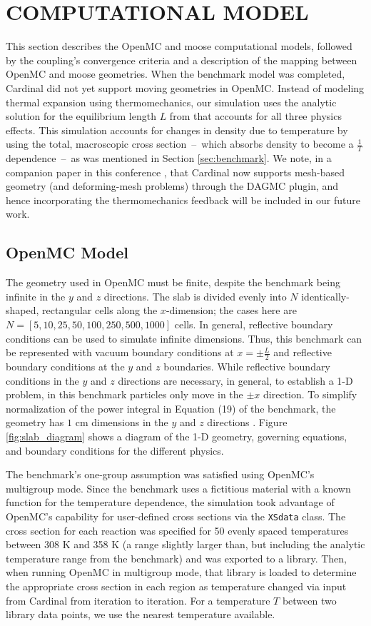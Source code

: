 \documentclass[letterpaper]{mc2023}
\begin{document}
\section{COMPUTATIONAL MODEL}\label{sec:model}
This section describes the OpenMC and \gls{moose} computational models, followed by the coupling's convergence criteria and
a description of the mapping between OpenMC and \gls{moose} geometries. When the benchmark model was completed, Cardinal did
not yet support moving geometries in OpenMC. Instead of modeling thermal expansion using thermomechanics, our simulation uses
the analytic solution for the equilibrium length $L$ from \cite{analytical-benchmark} that accounts for all three physics
effects. This simulation accounts for changes in density due to temperature by using the total, macroscopic cross section\ --\
which absorbs density to become a $\frac{1}{T}$ dependence\ --\ as was mentioned in Section \ref{sec:benchmark}. We note, in
a companion paper in this conference \cite{novak-2023}, that Cardinal now supports mesh-based geometry (and deforming-mesh
problems) through the DAGMC plugin, and hence incorporating the thermomechanics feedback will be included in our future work.

\subsection{OpenMC Model}
\label{sec:model:OpenMC}
The geometry used in OpenMC must be finite, despite the benchmark being infinite in the $y$ and $z$ directions. The slab is
divided evenly into $N$ identically-shaped, rectangular cells along the $x$-dimension; the cases here are $N=[5,10,25,50,100,
250,500,1000]$ cells. In general, reflective boundary conditions can be used to simulate infinite dimensions. Thus, this
benchmark can be represented with vacuum boundary conditions at $x=\pm \frac{L}{2}$ and reflective boundary conditions at
the $y$ and $z$ boundaries. While reflective boundary conditions in the $y$ and $z$ directions are necessary, in general, to
establish a 1-D problem, in this benchmark particles only move in the $\pm x$ direction. To simplify normalization of the power
integral in Equation (19) of the benchmark, the geometry has $1$ cm dimensions in the $y$ and $z$ directions \cite{analytical-benchmark}.
Figure \ref{fig:slab_diagram} shows a diagram of the 1-D geometry, governing equations, and boundary conditions for the different physics.

The benchmark's one-group assumption was satisfied using OpenMC's multigroup mode. Since the benchmark uses a fictitious material
with a known function for the temperature dependence, the simulation took advantage of OpenMC's capability for user-defined
cross sections via the \texttt{XSdata} class. The cross section for each reaction was specified for 50 evenly spaced temperatures
between 308 K and 358 K (a range slightly larger than, but including the  analytic temperature range from the benchmark) and was
exported to a library. Then, when running OpenMC in multigroup mode, that library is loaded to determine the appropriate cross section
in each region as temperature changed via input from Cardinal from iteration to iteration. For a temperature $T$ between two library
data points, we use the nearest temperature available.
\end{document}
